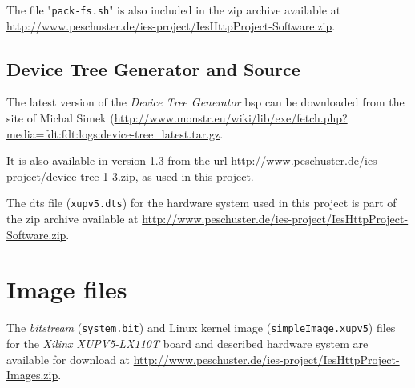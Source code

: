 The file "\texttt{pack-fs.sh}" is also included in the zip archive available at \url{http://www.peschuster.de/ies-project/IesHttpProject-Software.zip}.
\\

\subsection{Device Tree Generator and Source}
\label{subsec:dts-generator}

The latest version of the \textit{Device Tree Generator} \gls{bsp} can be downloaded from the site of Michal Simek (\url{http://www.monstr.eu/wiki/lib/exe/fetch.php?media=fdt:fdt:logs:device-tree_latest.tar.gz}.

It is also available in version 1.3 from the url \url{http://www.peschuster.de/ies-project/device-tree-1-3.zip}, as used in this project.

The dts file (\texttt{xupv5.dts}) for the hardware system used in this project is part of the zip archive available at \url{http://www.peschuster.de/ies-project/IesHttpProject-Software.zip}.
\\

\section{Image files}

The \textit{bitstream} (\texttt{system.bit}) and Linux kernel image (\texttt{simpleImage.xupv5}) files for the \textit{Xilinx XUPV5-LX110T} board and described hardware system are available for download at \url{http://www.peschuster.de/ies-project/IesHttpProject-Images.zip}.